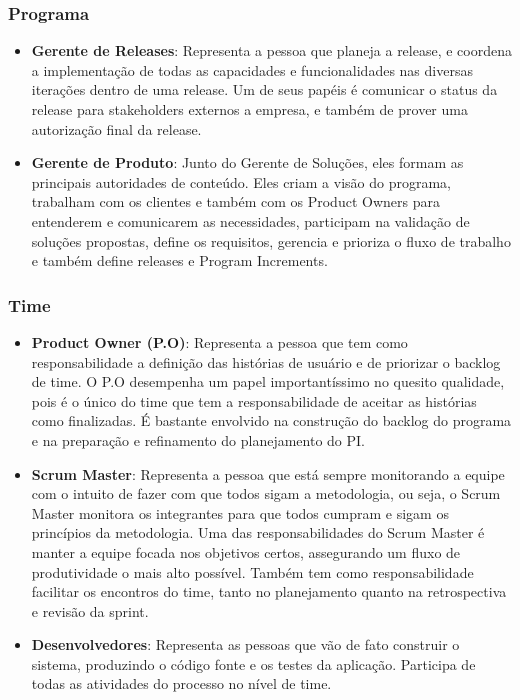 \subsubsection{\textbf{Programa}}

  \begin{itemize}
    \item \textbf {Gerente de Releases}: Representa a pessoa que planeja a release, e coordena a implementação de todas as capacidades e funcionalidades nas diversas iterações dentro de uma release. Um de seus papéis é comunicar o status da release para stakeholders externos a empresa, e também de prover uma autorização final da release.
    \item \textbf {Gerente de Produto}: Junto do Gerente de Soluções, eles formam as principais autoridades de conteúdo. Eles criam a visão do programa, trabalham com os clientes e também com os Product Owners para entenderem e comunicarem as necessidades, participam na validação de soluções propostas, define os requisitos, gerencia e prioriza o fluxo de trabalho e também define releases e Program Increments.
  \end{itemize}

\subsubsection{\textbf{Time}}

  \begin{itemize}
    \item \textbf {Product Owner (P.O)}: Representa a pessoa que tem como responsabilidade a definição das histórias de usuário e de priorizar o backlog de time. O P.O desempenha um papel importantíssimo no quesito qualidade, pois é o único do time que tem a responsabilidade de aceitar as histórias como finalizadas. É bastante envolvido na construção do backlog do programa e na preparação e refinamento do planejamento do PI.
    \item \textbf {Scrum Master}: Representa a pessoa que está sempre monitorando a equipe com o intuito de fazer com que todos sigam a metodologia, ou seja, o Scrum Master monitora os integrantes para que todos cumpram e sigam os princípios da metodologia. Uma das responsabilidades do Scrum Master é manter a equipe focada nos objetivos certos, assegurando um fluxo de produtividade o mais alto possível. Também tem como responsabilidade facilitar os encontros do time, tanto no planejamento quanto na retrospectiva e revisão da sprint.
    \item \textbf {Desenvolvedores}: Representa as pessoas que vão de fato construir o sistema, produzindo o código fonte e os testes da aplicação. Participa de todas as atividades do processo no nível de time.  
  \end{itemize}

